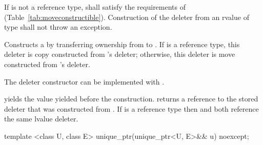 \begin{itemdescr}
\pnum
\requires If  is not a reference type,
 shall satisfy the requirements of 
(Table~\ref{tab:moveconstructible}).
Construction
of the deleter from an rvalue of type  shall not
throw an exception.

\pnum
\effects Constructs a  by transferring ownership from
 to . If  is a reference type, this
deleter is copy constructed from 's deleter; otherwise, this
deleter is move constructed from 's deleter. \begin{note} The
deleter constructor can be implemented with . \end{note}

\pnum
\postconditions {} yields the value 
yielded before the construction.  returns a reference
to the stored deleter that was constructed from
. If  is a reference type then
 and  both reference
the same lvalue deleter.
\end{itemdescr}

%
\begin{itemdecl}
template <class U, class E> unique_ptr(unique_ptr<U, E>&& u) noexcept;
\end{itemdecl}

